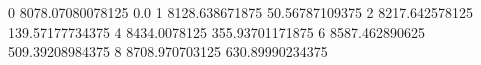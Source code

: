 0 8078.07080078125 0.0
1 8128.638671875 50.56787109375
2 8217.642578125 139.57177734375
4 8434.0078125 355.93701171875
6 8587.462890625 509.39208984375
8 8708.970703125 630.89990234375
